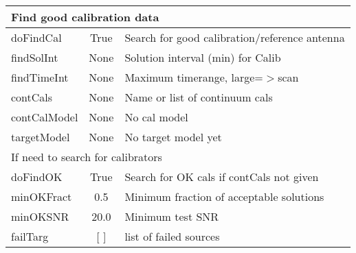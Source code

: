 \documentclass[11pt]{article}
\begin{document}
\begin{center}
\begin{tabular}{|l|c|l|}
\hline
\multicolumn{3}{|l|}{Find good calibration data} \\
\hline
doFindCal & True & Search for good calibration/reference antenna \\
findSolInt & None & Solution interval (min) for Calib \\
findTimeInt & None & Maximum timerange, large=$>$scan \\
contCals & None & Name or list of continuum cals \\
contCalModel & None & No cal model \\
targetModel & None & No target model yet \\

\hline
\multicolumn{3}{|l|}{If need to search for calibrators} \\
\hline
doFindOK & True & Search for OK cals if contCals not given \\
minOKFract & 0.5 & Minimum fraction of acceptable solutions \\
minOKSNR & 20.0 & Minimum test SNR \\
failTarg & [ ] & list of failed sources \\

\hline
\end{tabular}
\end{center}
\clearpage
\end{document}
